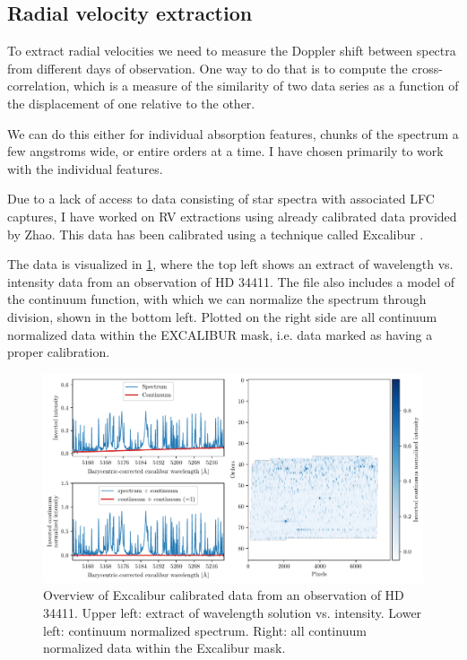 \subsection{Radial velocity extraction}

    To extract radial velocities we need to measure the Doppler shift between spectra from different days of observation. One way to do that is to compute the cross-correlation, which is a measure of the similarity of two data series as a function of the displacement of one relative to the other.
    
    We can do this either for individual absorption features, chunks of the spectrum a few angstroms wide, or entire orders at a time. I have chosen primarily to work with the individual features.

    Due to a lack of access to data consisting of star spectra with associated LFC captures, I have worked on RV extractions using already calibrated data provided by Zhao. This data has been calibrated using a technique called Excalibur \cite{zhao2021excalibur}.
    
    The data is visualized in \ref{fig:rv_data_overview}, where the top left shows an extract of wavelength vs. intensity data from an observation of HD 34411. The file also includes a model of the continuum function, with which we can normalize the spectrum through division, shown in the bottom left. Plotted on the right side are all continuum normalized data within the EXCALIBUR mask, i.e. data marked as having a proper calibration.

    \begin{figure}%
        \begin{wide}  
            \includegraphics[width=\textwidth]{figures/rv_data_overview.pdf}
            \caption{Overview of Excalibur calibrated data from an observation of HD 34411. Upper left: extract of wavelength solution vs. intensity. Lower left: continuum normalized spectrum. Right: all continuum normalized data within the Excalibur mask.}
            \label{fig:rv_data_overview}
        \end{wide}
    \end{figure}
            
